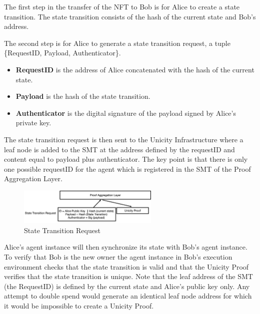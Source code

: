 \documentclass{article}
\begin{document}
\vspace{2mm}

The first step in the transfer of the NFT to Bob is for Alice to create a state transition. The state transition consists of the hash of the current state and Bob's address. 

\vspace{2mm}
The second step is for Alice to generate a state transition request, a tuple \{RequestID, Payload, Authenticator\}.

\begin{itemize}
\setlength{\leftmargin}{1em}
 \item  \textbf{RequestID} is the address of Alice concatenated with the hash of the current state.
 \item \textbf{Payload} is the hash of the state transition. 
 \item \textbf{Authenticator} is the digital signature of the payload signed by Alice’s private key.
\end{itemize}

The state transition request is then sent to the Unicity Infrastructure where a leaf node is added to the SMT at the address defined by the requestID and content equal to payload plus authenticator. The key point is that there is only one possible requestID for the agent which is registered in the SMT of the Proof Aggregation Layer.

\begin{figure}[H]
    \centering
    \includegraphics[width=0.6\textwidth]{STR.png}
    \caption{State Transition Request}
    \label{fig:STR}
\end{figure}




Alice's agent instance will then synchronize its state with Bob's agent instance. To verify that Bob is the new owner the agent instance in Bob's execution environment checks that the state transition is valid and that the Unicity Proof verifies that the state transition is unique. Note that the leaf address of the SMT (the RequestID) is defined by the current state and Alice’s public key only.  Any attempt to double spend would generate an identical leaf node address for which it would be impossible to create a Unicity Proof.
\end{document}
